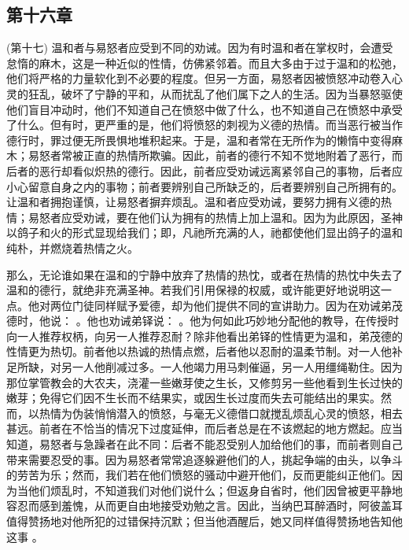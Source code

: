 
\subsection{第十六章}

\par

(第十七) 温和者与易怒者应受到不同的劝诫。因为有时温和者在掌权时，会遭受怠惰的麻木，这是一种近似的性情，仿佛紧邻着。而且大多由于过于温和的松弛，他们将严格的力量软化到不必要的程度。但另一方面，易怒者因被愤怒冲动卷入心灵的狂乱，破坏了宁静的平和，从而扰乱了他们属下之人的生活。因为当暴怒驱使他们盲目冲动时，他们不知道自己在愤怒中做了什么，也不知道自己在愤怒中承受了什么。但有时，更严重的是，他们将愤怒的刺视为义德的热情。而当恶行被当作德行时，罪过便无所畏惧地堆积起来。于是，温和者常在无所作为的懒惰中变得麻木；易怒者常被正直的热情所欺骗。因此，前者的德行不知不觉地附着了恶行，而后者的恶行却看似炽热的德行。因此，前者应受劝诫远离紧邻自己的事物，后者应小心留意自身之内的事物；前者要辨别自己所缺乏的，后者要辨别自己所拥有的。让温和者拥抱谨慎，让易怒者摒弃烦乱。温和者应受劝诫，要努力拥有义德的热情；易怒者应受劝诫，要在他们认为拥有的热情上加上温和。因为为此原因，圣神以鸽子和火的形式显现给我们；即，凡祂所充满的人，祂都使他们显出鸽子的温和纯朴，并燃烧着热情之火。\par

那么，无论谁如果在温和的宁静中放弃了热情的热忱，或者在热情的热忱中失去了温和的德行，就绝非充满圣神。若我们引用保禄的权威，或许能更好地说明这一点。他对两位门徒同样赋予爱德，却为他们提供不同的宣讲助力。因为在劝诫弟茂德时，他说： 。他也劝诫弟铎说： 。他为何如此巧妙地分配他的教导，在传授时向一人推荐权柄，向另一人推荐忍耐？除非他看出弟铎的性情更为温和，弟茂德的性情更为热切。前者他以热诚的热情点燃，后者他以忍耐的温柔节制。对一人他补足所缺，对另一人他削减过多。一人他竭力用马刺催逼，另一人用缰绳勒住。因为那位掌管教会的大农夫，浇灌一些嫩芽使之生长，又修剪另一些他看到生长过快的嫩芽；免得它们因不生长而不结果实，或因生长过度而失去可能结出的果实。然而，以热情为伪装悄悄潜入的愤怒，与毫无义德借口就搅乱烦乱心灵的愤怒，相去甚远。前者在不恰当的情况下过度延伸，而后者总是在不该燃起的地方燃起。应当知道，易怒者与急躁者在此不同：后者不能忍受别人加给他们的事，而前者则自己带来需要忍受的事。因为易怒者常常追逐躲避他们的人，挑起争端的由头，以争斗的劳苦为乐；然而，我们若在他们愤怒的骚动中避开他们，反而更能纠正他们。因为当他们烦乱时，不知道我们对他们说什么；但返身自省时，他们因曾被更平静地容忍而感到羞愧，从而更自由地接受劝勉之言。因此，当纳巴耳醉酒时，阿彼盖耳值得赞扬地对他所犯的过错保持沉默；但当他酒醒后，她又同样值得赞扬地告知他这事 。\par

